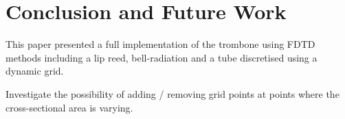 \section{Conclusion and Future Work}\label{sec:conclusion}
This paper presented a full implementation of the trombone using FDTD methods including a lip reed, bell-radiation and a tube discretised using a dynamic grid.



Investigate the possibility of adding / removing grid points at points where the cross-sectional area is varying. 